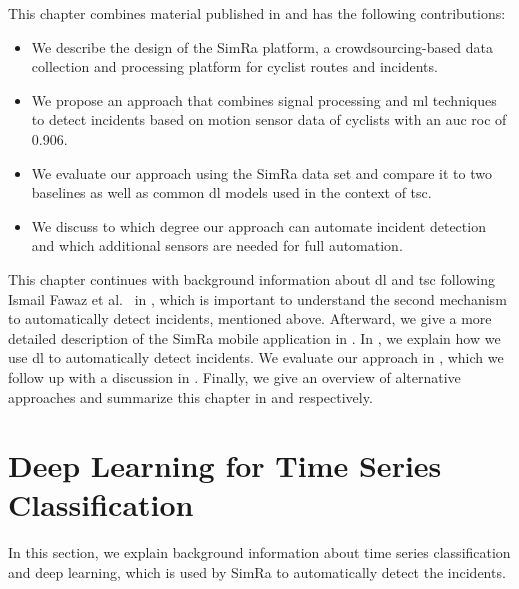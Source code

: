 This chapter combines material published in \cite{karakaya2020simra,karakaya2022cyclesense} and has the following contributions:
\begin{itemize}
\item We describe the design of the SimRa platform, a crowdsourcing-based data collection and processing platform for cyclist routes and incidents.
\item We propose an approach that combines signal processing and \ac{ml} techniques to detect incidents based on motion sensor data of cyclists with an \ac{auc} \ac{roc} of 0.906.
\item We evaluate our approach using the SimRa data set and compare it to two baselines as well as common \acl{dl} models used in the context of \acl{tsc}.
\item We discuss to which degree our approach can automate incident detection and which additional sensors are needed for full automation.
\end{itemize}

This chapter continues with background information about \ac{dl} and \ac{tsc} following Ismail Fawaz et al.~\cite{ismail2019deep} in , which is important to understand the second mechanism to automatically detect incidents, mentioned above.
Afterward, we give a more detailed description of the SimRa mobile application in .
In , we explain how we use \ac{dl} to automatically detect incidents.
We evaluate our approach in , which we follow up with a discussion in .
Finally, we give an overview of alternative approaches and summarize this chapter in  and  respectively.

\section{Deep Learning for Time Series Classification}
\label{sec:deep_learning_background}
In this section, we explain background information about time series classification and deep learning, which is used by SimRa to automatically detect the incidents.

